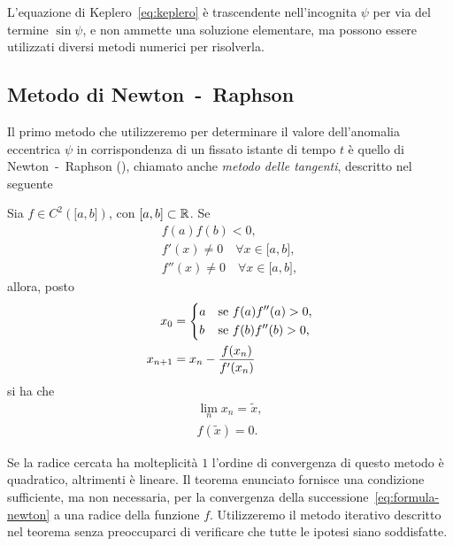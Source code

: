 L'equazione di Keplero~\eqref{eq:keplero} è trascendente nell'incognita $\psi$
per via del termine $\sin\psi$, e non ammette una soluzione elementare, ma
possono essere utilizzati diversi metodi numerici per risolverla.

\subsection{Metodo di Newton~-~Raphson}
\label{sec:newton}

Il primo metodo che utilizzeremo per determinare il valore dell'anomalia
eccentrica $\psi$ in corrispondenza di un fissato istante di tempo $t$ è quello
di Newton~-~Raphson (\textcite[30]{brugnano:calcolo-numerico}), chiamato anche
\emph{metodo delle tangenti}, descritto nel seguente
\begin{teorema}
  Sia $f\in C^2(\mathopen{[}a,b\mathclose{]})$, con
  $\mathopen{[}a,b\mathclose{]}\subset\mathbb{R}$. Se
  \begin{subequations}
    \begin{gather}
      f(a)f(b) <0, \label{eq:esistenza-zero}\\
      f'(x) \neq 0 \quad \forall x \in \mathopen{[}a,b\mathclose{]},\\
      f''(x) \neq 0 \quad \forall x \in \mathopen{[}a,b\mathclose{]},
    \end{gather}
  \end{subequations}
  allora, posto
  \begin{subequations}
    \begin{align}
      x_0 &=
      \begin{dcases}
        a & \text{se $f(a)f''(a)>0$,}\\
        b & \text{se $f(b)f''(b)>0$,}
      \end{dcases}\\
      x_{n+1} &= x_n - \frac{f(x_n)}{f'(x_n)} \label{eq:formula-newton}
    \end{align}
  \end{subequations}
  si ha che
  \begin{subequations}
    \begin{gather}
      \lim_n x_n = \tilde{x},\\
      f(\tilde{x}) = 0.
    \end{gather}
  \end{subequations}
\end{teorema}
Se la radice cercata ha molteplicità $1$ l'ordine di convergenza di questo
metodo è quadratico, altrimenti è lineare. Il teorema enunciato fornisce una
condizione sufficiente, ma non necessaria, per la convergenza della
successione~\eqref{eq:formula-newton} a una radice della funzione
$f$. Utilizzeremo il metodo iterativo descritto nel teorema senza preoccuparci
di verificare che tutte le ipotesi siano soddisfatte.

